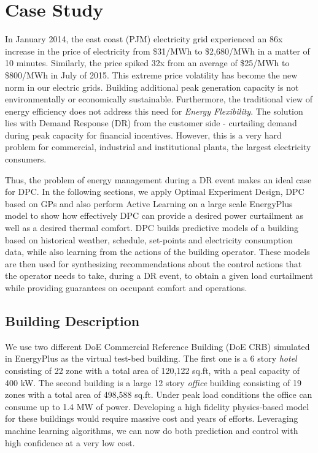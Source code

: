 \section{Case Study}
\label{S:casestudy}

In January 2014, the east coast (PJM) electricity grid experienced an 86x increase in the price of electricity from \$31/MWh to \$2,680/MWh in a matter of 10 minutes. Similarly, the price spiked 32x from an average of \$25/MWh to \$800/MWh in July of 2015. This extreme price volatility has become the new norm in our electric grids. Building additional peak generation capacity is not environmentally or economically sustainable. Furthermore, the traditional view of energy efficiency does not address this need for \emph{Energy Flexibility}. The solution lies with Demand Response (DR) from the customer side - curtailing demand during peak capacity for financial incentives. However, this is a very hard problem for commercial, industrial and institutional plants, the largest electricity consumers.

Thus, the problem of energy management during a DR event makes an ideal case for DPC. In the following sections, we apply Optimal Experiment Design, DPC based on GPs and also perform Active Learning on a large scale EnergyPlus model to show how effectively DPC can provide a desired power curtailment as well as a desired thermal comfort. DPC builds predictive models of a building based on historical weather, schedule, set-points and electricity consumption data, while also learning from the actions of the building operator. These models are then used for synthesizing recommendations about the control actions that the operator needs to take, during a DR event, to obtain a given load curtailment while providing guarantees on occupant comfort and operations.

\subsection{Building Description}
\label{SS:casestudy:building}
We use two different DoE Commercial Reference Building (DoE CRB) simulated in EnergyPlus \cite{Deru2011} as the virtual test-bed building.
The first one is a 6 story \textit{hotel} consisting of 22 zone with a total area of 120,122 sq.ft, with a peal capacity of 400 kW.
The second building is a large 12 story \textit{office} building consisting of 19 zones with a total area of 498,588 sq.ft. 
Under peak load conditions the office can consume up to 1.4 MW of power. 
Developing a high fidelity physics-based model for these buildings would require massive cost and years of efforts.
Leveraging machine learning algorithms, we can now do both prediction and control with high confidence at a very low cost.

